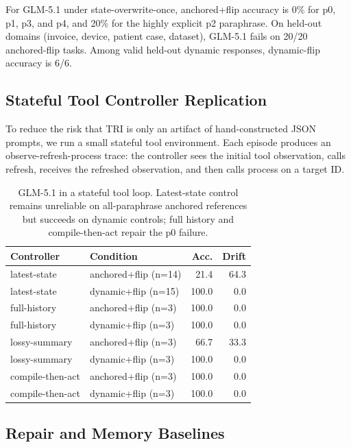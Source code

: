 \documentclass[11pt]{article}
\begin{document}
For GLM-5.1 under state-overwrite-once, anchored+flip accuracy is 0\% for p0, p1, p3, and p4, and 20\% for the highly explicit p2 paraphrase. On held-out domains (invoice, device, patient case, dataset), GLM-5.1 fails on 20/20 anchored-flip tasks. Among valid held-out dynamic responses, dynamic-flip accuracy is 6/6.

\subsection{Stateful Tool Controller Replication}

To reduce the risk that TRI is only an artifact of hand-constructed JSON prompts, we run a small stateful tool environment. Each episode produces an observe-refresh-process trace: the controller sees the initial tool observation, calls refresh, receives the refreshed observation, and then calls process on a target ID.

\begin{table}[h]
\centering
\small
\begin{tabular}{llrr}
\toprule
Controller & Condition & Acc. & Drift \\
\midrule
latest-state & anchored+flip (n=14) & 21.4 & 64.3 \\
latest-state & dynamic+flip (n=15) & 100.0 & 0.0 \\
full-history & anchored+flip (n=3) & 100.0 & 0.0 \\
full-history & dynamic+flip (n=3) & 100.0 & 0.0 \\
lossy-summary & anchored+flip (n=3) & 66.7 & 33.3 \\
lossy-summary & dynamic+flip (n=3) & 100.0 & 0.0 \\
compile-then-act & anchored+flip (n=3) & 100.0 & 0.0 \\
compile-then-act & dynamic+flip (n=3) & 100.0 & 0.0 \\
\bottomrule
\end{tabular}
\caption{GLM-5.1 in a stateful tool loop. Latest-state control remains unreliable on all-paraphrase anchored references but succeeds on dynamic controls; full history and compile-then-act repair the p0 failure.}
\end{table}

\subsection{Repair and Memory Baselines}
\end{document}
